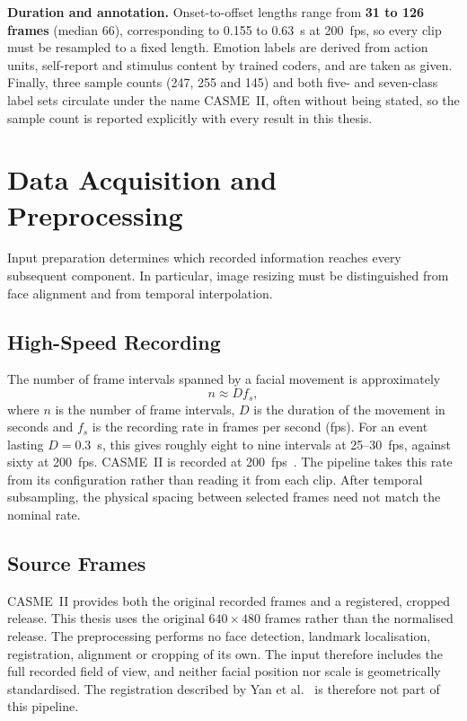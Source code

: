 \textbf{Duration and annotation.} Onset-to-offset lengths range from \textbf{31 to 126 frames} (median 66), corresponding to 0.155 to 0.63~s at 200~fps, so every clip must be resampled to a fixed length. Emotion labels are derived from action units, self-report and stimulus content by trained coders, and are taken as given. Finally, three sample counts (247, 255 and 145) and both five- and seven-class label sets circulate under the name CASME~II, often without being stated, so the sample count is reported explicitly with every result in this thesis.


\section{Data Acquisition and Preprocessing}
\label{sec:recording-to-input}

Input preparation determines which recorded information reaches every subsequent component. In particular, image resizing must be distinguished from face alignment and from temporal interpolation.

\subsection{High-Speed Recording}
\label{sec:high-speed-capture}

The number of frame intervals spanned by a facial movement is approximately
\begin{equation}
	n \approx D f_s,
	\label{eq:frame-intervals}
\end{equation}
where $n$ is the number of frame intervals, $D$ is the duration of the movement in seconds and $f_s$ is the recording rate in frames per second (fps). For an event lasting $D = 0.3$~s, this gives roughly eight to nine intervals at 25--30~fps, against sixty at 200~fps. CASME~II is recorded at 200~fps~\cite{yan2014}. The pipeline takes this rate from its configuration rather than reading it from each clip. After temporal subsampling, the physical spacing between selected frames need not match the nominal rate.

\subsection{Source Frames}
\label{sec:corpus-supplies}

CASME~II provides both the original recorded frames and a registered, cropped release. This thesis uses the original $640\times480$ frames rather than the normalised release. The preprocessing performs no face detection, landmark localisation, registration, alignment or cropping of its own. The input therefore includes the full recorded field of view, and neither facial position nor scale is geometrically standardised. The registration described by Yan et al.~\cite{yan2014} is therefore not part of this pipeline.

